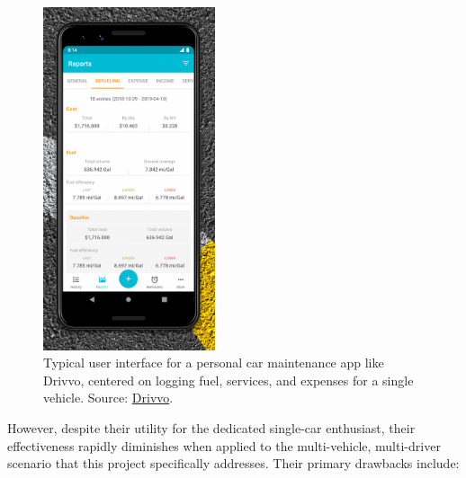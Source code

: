 \begin{figure}[H]
    \centering
    \includegraphics[width=0.45\textwidth]{images/background/drivvo-dashboard.png}
    \caption{Typical user interface for a personal car maintenance app like Drivvo, centered on logging fuel, services, and expenses for a single vehicle. Source: \href{https://play.google.com/store/apps/details?id=br.com.ctncardoso.ctncar&pcampaignid=web_share}{Drivvo}.}
\end{figure}

\textgap

However, despite their utility for the dedicated single-car enthusiast, their effectiveness rapidly diminishes when applied to the multi-vehicle, multi-driver scenario that this project specifically addresses. Their primary drawbacks include:

